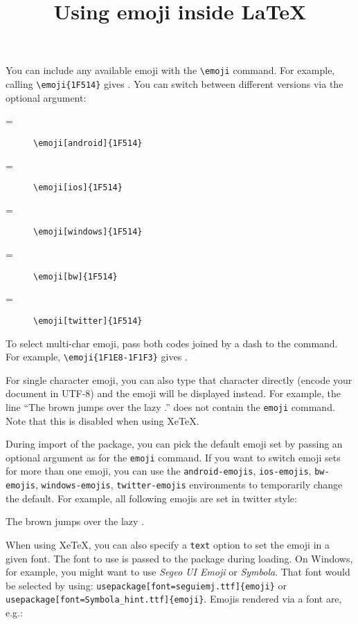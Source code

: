 \documentclass{article}
\title{Using emoji inside \LaTeX}
\newcommand{\dogline}{The \emoji{23E9} brown \emoji{1F43A} jumps over the lazy \emoji{1F436}.}
\newcommand{\dogline}{The \emoji{23E9} brown \emoji{1F43A} jumps over the lazy \emoji{1F436}.}
\newcommand{\dogline}{The ⏩ brown 🐺 jumps over the lazy 🐶.}
\begin{document}
\maketitle

You can include any available emoji with the \verb|\emoji| command. For example, calling \verb|\emoji{1F514}| gives . You can switch between different versions via the optional argument:
\begin{description}
\item[{} =] \verb|\emoji[android]{1F514}|
\item[{} =] \verb|\emoji[ios]{1F514}|
\item[{} =] \verb|\emoji[windows]{1F514}|
\item[{} =] \verb|\emoji[bw]{1F514}|
\item[{} =] \verb|\emoji[twitter]{1F514}|
\end{description}
To select multi-char emoji, pass both codes joined by a dash to the command. For example, \verb|\emoji{1F1E8-1F1F3}| gives .

For single character emoji, you can also type that character directly (encode your document in UTF-8) and the emoji will be displayed instead. For example, the line ``\dogline'' does not contain the \verb|emoji| command. Note that this is disabled when using XeTeX. 

During import of the package, you can pick the default emoji set by passing an optional argument as for the \verb|emoji| command. If you want to switch emoji sets for more than one emoji, you can use the \verb|android-emojis|, \verb|ios-emojis|, \verb|bw-emojis|, \verb|windows-emojis|, \verb|twitter-emojis| environments to temporarily change the default. For example, all following emojis are set in twitter style:
\begin{twitter-emojis}
\dogline
\end{twitter-emojis}

When using XeTeX, you can also specify a \verb|text| option to set the emoji in a given font. The font to use is passed to the package during loading. On Windows, for example, you might want to use \textit{Segeo UI Emoji} or \textit{Symbola}. That font would be selected by using: \verb|usepackage[font=seguiemj.ttf]{emoji}| or \verb|usepackage[font=Symbola_hint.ttf]{emoji}|. Emojis rendered via a font are, e.g.: 
\begin{text-emojis}
  
\end{text-emojis}
\end{document}
